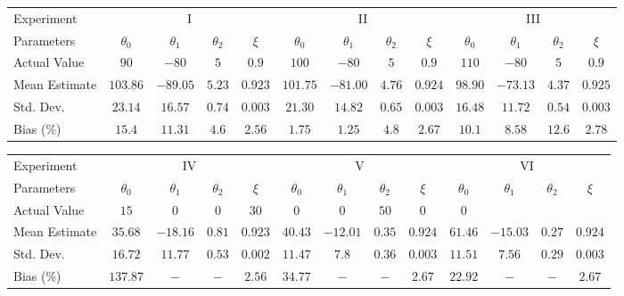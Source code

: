 \documentclass[12pt]{iopart}
\begin{document}

\tiny{\begin{tabular}{lcccccccccccc}
Experiment&\multicolumn{4}{c}{I}&\multicolumn{4}{c}{II}&\multicolumn{4}{c}{III}\\
 Parameters&$\theta_0$&$\theta_1$&$\theta_2$&$\xi$&$\theta_0$&$\theta_1$&$\theta_2$&$\xi$&$\theta_0$&$\theta_1$&$\theta_2$&$\xi$\\
\hline\hline
Actual Value&$90$&$-80$&$5$&$0.9$&$100$&$-80$&$5$&$0.9$&$110$&$-80$&$5$&$0.9$\\
Mean Estimate&$103.86$&$-89.05$&$5.23$&$0.923$&$101.75$&$-81.00$&$4.76$&$0.924$&$98.90 $&$-73.13$&$4.37$&$0.925$\\
Std. Dev.&$23.14$&$16.57$&$0.74$&$0.003$&$21.30$&$14.82$&$0.65$&$0.003$&$16.48$& $11.72$&$0.54$&$0.003$\\
Bias (\%)& $15.4$&$11.31$&$4.6$&$2.56$&$1.75$&$1.25$&$4.8$&$2.67$&$10.1$&$ 8.58$&$12.6$&$2.78$  \\
\end{tabular}\label{tab:MexicanHatKernelResults}}

\tiny{\begin{tabular}{lcccccccccccc}
Experiment&\multicolumn{4}{c}{IV}&\multicolumn{4}{c}{V}&\multicolumn{4}{c}{VI}\\
 Parameters&$\theta_0$&$\theta_1$&$\theta_2$&$\xi$&$\theta_0$&$\theta_1$&$\theta_2$&$\xi$&$\theta_0$&$\theta_1$&$\theta_2$&$\xi$\\
\hline\hline
Actual Value&$15$&$0$&$0$&$30$&$0$&$0$&$50$&$0$&$0$\\
Mean Estimate&$35.68$&$-18.16$&$0.81$&$0.923$&$40.43$&$-12.01$&$ 0.35$&$0.924$&$61.46$&$-15.03$&$0.27$&$0.924$\\
Std. Dev.&$16.72$&$11.77$&$0.53$&$0.002$&$11.47$&$7.8$&$0.36$&$0.003$&$11.51$&$7.56$&$0.29$&$0.003$\\
Bias (\%)&$137.87$&$-$&$-$&$2.56$&$34.77$&$-$&$-$&$2.67$&$22.92$&$-$&$-$&$2.67$\\
\end{tabular}\label{tab:GaussianKernelResults}}
\end{document}
